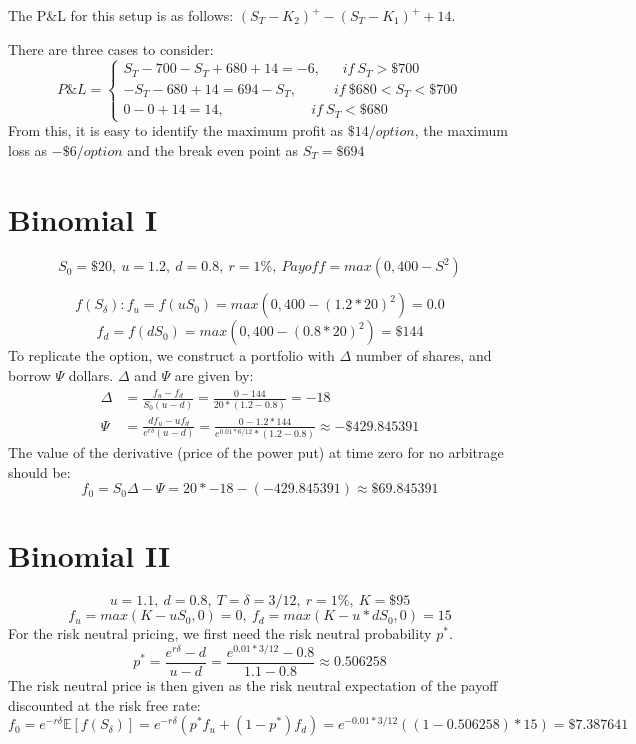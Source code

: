 \documentclass{article}
\begin{document}
The P\&L for this setup is as follows: $(S_T - K_2)^+ - (S_T - K_1)^+ + 14$.

There are three cases to consider:
$$P\&L = \begin{cases} S_T - 700 - S_T + 680 + 14 = -6, \ \ \ \ \ \ \ if \ S_T > \$700 \\ -S_T - 680 + 14 = 694 - S_T, \ \ \ \ \ \ \ \ \ \ \  \ if \ \$680<S_T<\$700 \\ 0 - 0 + 14 = 14, \ \ \ \ \ \ \ \ \ \ \ \ \ \ \ \ \ \ \ \ \ \ \ \ \ \ \ \  if \ S_T < \$680\end{cases}$$
From this, it is easy to identify the maximum profit as $\$14/option$, the maximum loss as $-\$6/option$ and the break even point as $S_T=\$694$

\section{Binomial I}
$$ S_0 = \$20, \ u = 1.2, \ d = 0.8, \ r=1\%, \ Payoff = max(0, 400 - S^2)$$

$$f(S_{\delta}): f_u = f(uS_0) = max(0, 400 - (1.2*20)^2) = 0.0$$
$$f_d = f(dS_0) = max(0, 400 - (0.8*20)^2) = \$144$$
To replicate the option, we construct a portfolio with $\Delta$ number of shares, and borrow $\Psi$ dollars. $\Delta$ and $\Psi$ are given by:
\begin{align*}
	\Delta &= \frac{f_u - f_d}{S_0 (u -d)} = \frac{0 - 144}{20 * (1.2 - 0.8)} = -18 \\
	\Psi &= \frac{df_u - uf_d}{e^{r\delta}(u-d)} = \frac{0 - 1.2 * 144}{e^{0.01 * 6/12} * (1.2-0.8)} \approx -\$429.845391
\end{align*}
The value of the derivative (price of the power put) at time zero for no arbitrage should be:
$$f_0 = S_0\Delta - \Psi = 20*-18 - (-429.845391) \approx \$69.845391 $$

\section{Binomial II}
$$u = 1.1, \ d = 0.8, \ T=\delta=3/12, \ r = 1\%, \ K = \$95$$
$$f_u = max(K - uS_0, 0) = 0, \ f_d = max(K - u * dS_0, 0) = 15$$
For the risk neutral pricing, we first need the risk neutral probability $p^*$.
$$p^* = \frac{e^{r\delta} - d}{u - d} = \frac{e^{0.01 * 3/12}-0.8}{1.1-0.8} \approx 0.506258$$
The risk neutral price is then given as the risk neutral expectation of the payoff discounted at the risk free rate:
$$f_0 = e^{-r\delta}\mathbb{E}[f(S_{\delta})] = e^{-r\delta}\left(p^*f_u + (1-p^*)f_d\right) = e^{-0.01*3/12}\left((1-0.506258)*15\right) = \$7.387641$$
\end{document}

